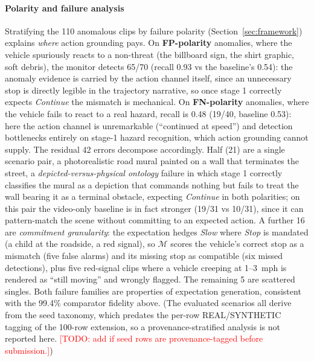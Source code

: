 \documentclass[conference]{IEEEtran}
\newcommand{\Mcal}{\mathcal{M}}            %
\newcommand{\todo}[1]{\textcolor{red}{[TODO: #1]}}
\begin{document}
\paragraph{Polarity and failure analysis} Stratifying the 110 anomalous clips by failure polarity (Section~\ref{sec:framework}) explains \emph{where} action grounding pays. On \textbf{FP-polarity} anomalies, where the vehicle spuriously reacts to a non-threat (the billboard sign, the shirt graphic, soft debris), the monitor detects 65/70 (recall 0.93 vs the baseline's 0.54): the anomaly evidence is carried by the action channel itself, since an unnecessary stop is directly legible in the trajectory narrative, so once stage 1 correctly expects \emph{Continue} the mismatch is mechanical. On \textbf{FN-polarity} anomalies, where the vehicle fails to react to a real hazard, recall is 0.48 (19/40, baseline 0.53): here the action channel is unremarkable (``continued at speed'') and detection bottlenecks entirely on stage-1 hazard recognition, which action grounding cannot supply. The residual 42 errors decompose accordingly. Half (21) are a single scenario pair, a photorealistic road mural painted on a wall that terminates the street, a \emph{depicted-versus-physical ontology} failure in which stage 1 correctly classifies the mural as a depiction that commands nothing but fails to treat the wall bearing it as a terminal obstacle, expecting \emph{Continue} in both polarities; on this pair the video-only baseline is in fact stronger (19/31 vs 10/31), since it can pattern-match the scene without committing to an expected action. A further 16 are \emph{commitment granularity}: the expectation hedges \emph{Slow} where \emph{Stop} is mandated (a child at the roadside, a red signal), so $\Mcal$ scores the vehicle's correct stop as a mismatch (five false alarms) and its missing stop as compatible (six missed detections), plus five red-signal clips where a vehicle creeping at 1--3~mph is rendered as ``still moving'' and wrongly flagged. The remaining 5 are scattered singles. Both failure families are properties of expectation generation, consistent with the 99.4\% comparator fidelity above. (The evaluated scenarios all derive from the seed taxonomy, which predates the per-row REAL/SYNTHETIC tagging of the 100-row extension, so a provenance-stratified analysis is not reported here. \todo{add if seed rows are provenance-tagged before submission.})
\end{document}
